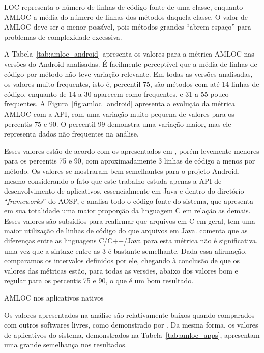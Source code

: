 LOC representa o número de linhas de código fonte de uma classe, enquanto AMLOC a média do número de linhas dos métodos daquela classe. O valor de AMLOC deve ser o menor possível, pois métodos grandes ``abrem espaço'' para problemas de complexidade excessiva. 

A Tabela~\ref{tab:amloc_android} apresenta os valores para a métrica AMLOC nas versões do Android analisadas. É facilmente perceptível que a média de linhas de código por método não teve variação relevante. Em todas as versões analisadas, os valores muito frequentes, isto é, percentil 75, são métodos com até 14 linhas de código, enquanto de 14 a 30 aparecem como frequentes, e 31 a 55 pouco frequentes. A Figura~\ref{fig:amloc_android} apresenta a evolução da métrica AMLOC com a API, com uma variação muito pequena de valores para os percentis 75 e 90. O percentil 99 demonstra uma variação maior, mas ele representa dados não frequentes na análise.

Esses valores estão de acordo com os apresentados em , porém levemente menores para os percentis 75 e 90, com aproximadamente 3 linhas de código a menos por método. Os valores se mostraram bem semelhantes para o projeto Android, mesmo considerando o fato que este trabalho estuda apenas a API de desenvolvimento de aplicativos, essencialmente em Java e dentro do diretório ``\textit{frameworks}'' do AOSP, e  analisa todo o código fonte do sistema, que apresenta em sua totalidade uma maior proporção da linguagem C em relação as demais. Esses valores são subsídios para reafirmar que arquivos em C em geral, tem uma maior utilização de linhas de código do que arquivos em Java.  comenta que as diferenças entre as linguagens C/C++/Java para esta métrica não é significativa, uma vez que a sintaxe entre as 3 é bastante semelhante. Dada essa afirmação, comparamos os intervalos definidos por ele, chegando à conclusão de que os valores das métricas estão, para todas as versões, abaixo dos valores bom e regular para os percentis 75 e 90, o que é um bom resultado.

\begin{table}[!htb]
\centering
{}

\caption{AMLOC nos aplicativos nativos}
\label{tab:amloc_apps}
\end{table}

Os valores apresentados na análise são relativamente baixos quando comparados com outros softwares livres, como demonstrado por . Da mesma forma, os valores de aplicativos do sistema, demonstrados na Tabela~\ref{tab:amloc_apps}, apresentam uma grande semelhança nos resultados. 


